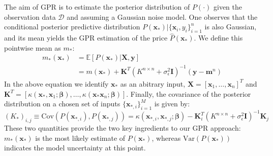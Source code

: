 \documentclass[a4paper,12pt]{article}
\begin{document}
The aim of GPR is to estimate the posterior distribution of $P(\cdot)$ given the observation data $\mathcal{D}$ and assuming a Gaussian noise model. One observes that the conditional posterior predictive distribution $P(\mathbf{x}_*)| \{\mathbf{x}_i,y_i\}_{i=1}^n$ is also Gaussian, and its mean yields the GPR estimation of the price $\hat{P}(\mathbf{x}_*)$. We define this pointwise mean as $m_*$:
\begin{equation}
\label{eq:mean}
\begin{aligned}
  m_*(\mathbf{x}_*) &= \mathbb{E}[P(\mathbf{x}_*)|\mathbf{X},\mathbf{y}]\\
                    &= m(\mathbf{x_*}) + \mathbf{K}^T(K^{n\times n}+\sigma^2_{\epsilon}\mathbf{I})^{-1}(\mathbf{y}-\mathbf{m}^n)
\end{aligned}
\end{equation}
In the above equation we identify $\mathbf{x}_*$ as an abitrary input, $\mathbf{X} = [\mathbf{x}_1,\dots,\mathbf{x}_n]^T$ and $\mathbf{K}^T = [\kappa(\mathbf{x}_*,\mathbf{x}_1;\boldsymbol{\beta}),\dots,\kappa(\mathbf{x}_*\mathbf{x}_n;\boldsymbol{\beta})]$. Finally, the covariance of the posterior distribution on a chosen set of inputs $\{ \mathbf{x}_{*,i}\}_{i=1}^M$ is given by:
\begin{equation}
    \label{eq:covariance}
    (K_*)_{i,j} \equiv \text{Cov}(P(\mathbf{x}_{*,i}),P(\mathbf{x}_{*,j}))= \kappa(\mathbf{x}_{*,i},\mathbf{x}_{*,j};\boldsymbol{\beta})-\mathbf{K}_i^T(K^{n \times n}+\sigma^2_{\epsilon}\mathbf{I})^{-1}\mathbf{K}_j
\end{equation}
These two quantities provide the two key ingredients to our GPR approach: $m_*(\mathbf{x}_*)$ is the most likely estimate of $P(\mathbf{x}_*)$, whereas $\text{Var}(P(\mathbf{x}_*))$ indicates the model uncertainty at this point. 
\end{document}
